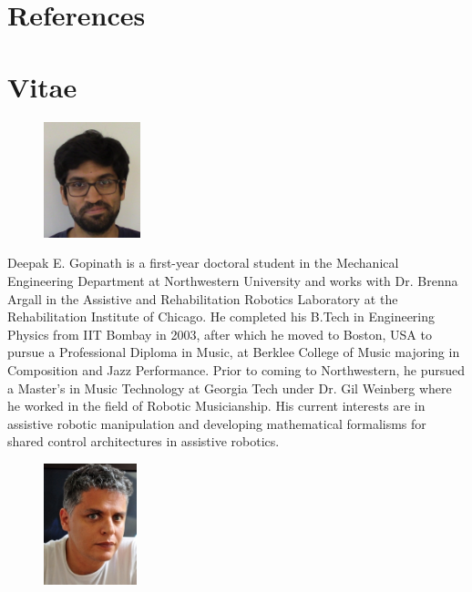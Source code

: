 \documentclass[final,1p,times]{elsarticle}
\begin{document}
\section*{References}
 

\section*{Vitae}
\begin{figure}
	\begin{center}
		\vspace{-.6cm}
		\includegraphics[width=0.25\textwidth]{./figures/deg.jpg}
	\end{center}
	\label{PAF}
\end{figure}

\noindent Deepak E. Gopinath is a first-year doctoral student in the Mechanical Engineering Department at Northwestern University and works with Dr. Brenna Argall in the Assistive and Rehabilitation Robotics Laboratory at the Rehabilitation Institute of Chicago. He completed his B.Tech in Engineering Physics from IIT Bombay in
2003, after which he moved to Boston, USA to pursue a Professional Diploma in Music, at Berklee College of Music majoring in Composition and Jazz Performance. Prior to coming to Northwestern, he pursued a Master's in Music Technology at Georgia Tech under Dr. Gil Weinberg where he worked in the field of Robotic Musicianship. His current interests are in assistive robotic manipulation and developing mathematical formalisms for shared control architectures in assistive robotics. \\ 
\begin{figure}
	\begin{center}
		\vspace{-.7cm}
		\includegraphics[width=0.24\textwidth]{./figures/gilw.jpg}
	\end{center}
	\vspace{-.45cm}
\end{figure}
\end{document}
